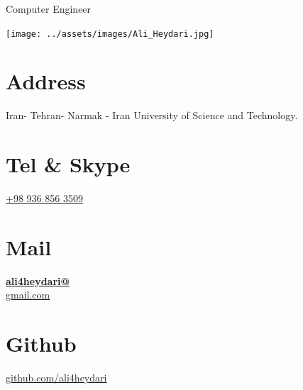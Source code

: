 \documentclass[a4paper]{./classes/friggeri-cv}
\begin{document}
    {Computer Engineer}


    \begin{aside}
        \texttt{[image: ../assets/images/Ali\_Heydari.jpg]}
        \section{Address}\label{sec:address}
        Iran- Tehran- Narmak -
        Iran University of Science and Technology.
        ~
        \section{Tel \& Skype}\label{sec:tel&skype}
        \href{tel:+989368563509}{+98 936 856 3509}
        ~
        \section{Mail}\label{sec:mail}
        \href{mailto:ali4heydari@gmail.com}{\textbf{ali4heydari@}\\gmail.com}
        ~
        \section{Github}\label{sec:git}
        \href{https://github.com/ali4heydari}{github.com/ali4heydari}

\end{aside}
\end{document}
